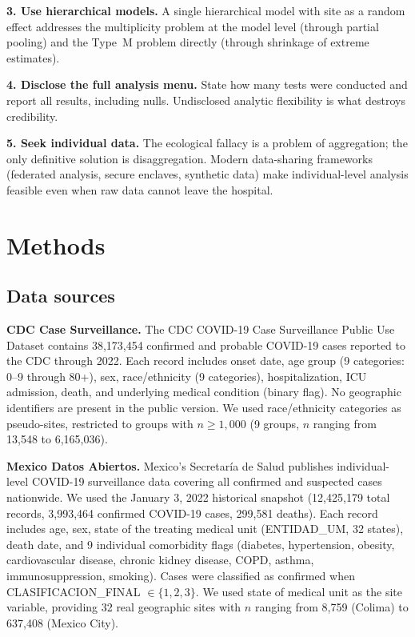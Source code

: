 \documentclass{article}
\begin{document}
\textbf{3. Use hierarchical models.}  A single hierarchical model with site
as a random effect addresses the multiplicity problem at the model level
(through partial pooling) and the Type~M problem directly (through
shrinkage of extreme estimates).

\textbf{4. Disclose the full analysis menu.}  State how many tests were
conducted and report all results, including nulls.  Undisclosed analytic
flexibility is what destroys credibility.

\textbf{5. Seek individual data.}  The ecological fallacy is a problem of
aggregation; the only definitive solution is disaggregation.  Modern
data-sharing frameworks (federated analysis, secure enclaves, synthetic
data) make individual-level analysis feasible even when raw data cannot
leave the hospital.


\section{Methods}

\subsection{Data sources}

\textbf{CDC Case Surveillance.}  The CDC COVID-19 Case Surveillance Public
Use Dataset contains 38,173,454 confirmed and probable COVID-19 cases reported
to the CDC through 2022.  Each record includes onset date, age group (9
categories: 0--9 through 80+), sex, race/ethnicity (9 categories),
hospitalization, ICU admission, death, and underlying medical condition (binary
flag).  No geographic identifiers are present in the public version.  We used
race/ethnicity categories as pseudo-sites, restricted to groups with $n \geq
1{,}000$ (9 groups, $n$ ranging from 13,548 to 6,165,036).

\textbf{Mexico Datos Abiertos.}  Mexico's Secretar\'{i}a de Salud publishes
individual-level COVID-19 surveillance data covering all confirmed and
suspected cases nationwide.  We used the January 3, 2022 historical snapshot
(12,425,179 total records, 3,993,464 confirmed COVID-19 cases, 299,581
deaths).  Each record includes age, sex, state of the treating medical unit
(ENTIDAD\_UM, 32 states), death date, and 9 individual comorbidity flags
(diabetes, hypertension, obesity, cardiovascular disease, chronic kidney
disease, COPD, asthma, immunosuppression, smoking).  Cases were classified as
confirmed when CLASIFICACION\_FINAL $\in \{1, 2, 3\}$.  We used state of
medical unit as the site variable, providing 32 real geographic sites with
$n$ ranging from 8,759 (Colima) to 637,408 (Mexico City).
\end{document}
